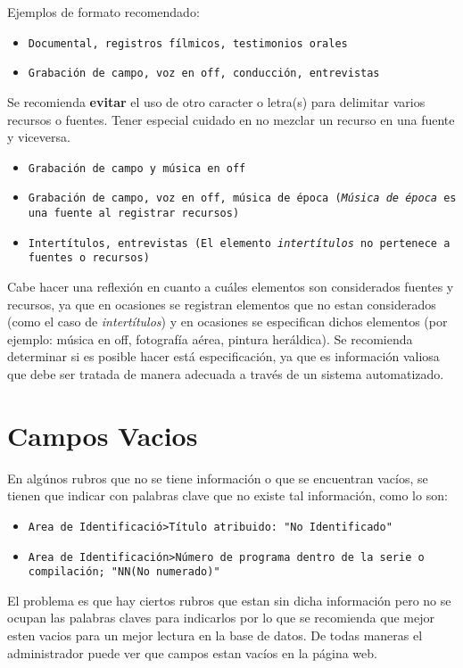 \documentclass[10pt,letterpaper]{article}
\begin{document}
Ejemplos de formato recomendado:
{\color{Blue}
\begin{itemize}
	\item \texttt{Documental, registros fílmicos, testimonios orales}
	\item \texttt{Grabación de campo, voz en off, conducción, entrevistas}
\end{itemize}
}

Se recomienda \textbf{evitar} el uso de otro caracter o letra(s) para delimitar varios recursos o fuentes. Tener especial cuidado en no mezclar un recurso en una fuente y viceversa.
{\color{Red}
\begin{itemize}
	\item \texttt{Grabación de campo y música en off}
	\item \texttt{Grabación de campo, voz en off, música de época (\textit{Música de época} es una fuente al registrar recursos)}
	\item \texttt{Intertítulos, entrevistas (El elemento \textit{intertítulos} no pertenece a fuentes o recursos)}
\end{itemize}
}

Cabe hacer una reflexión en cuanto a cuáles elementos son considerados fuentes y recursos, ya que en ocasiones se registran elementos que no estan considerados (como el caso de \textit{intertítulos}) y en ocasiones se especifican dichos elementos (por ejemplo: música en off, fotografía aérea, pintura heráldica). Se recomienda determinar si es posible hacer está especificación, ya que es información valiosa que debe ser tratada de manera adecuada a través de un sistema automatizado.


\section{Campos Vacios}
En algúnos rubros que no se tiene información o que se encuentran vacíos, se tienen que indicar con palabras clave que no existe tal información, como lo son:
\begin{itemize}
	\item \texttt{Area de Identificació>Título atribuido: "No Identificado"}
	\item \texttt{Area de Identificación>Número de programa dentro de la serie o compilación; "NN(No numerado)"}
\end{itemize}

El problema es que hay ciertos rubros que estan sin dicha información pero no se ocupan las palabras claves para indicarlos por lo que se recomienda que mejor esten vacios para un mejor lectura en la base de datos.
De todas maneras el administrador puede ver que campos estan vacíos en la página web.
\end{document}
